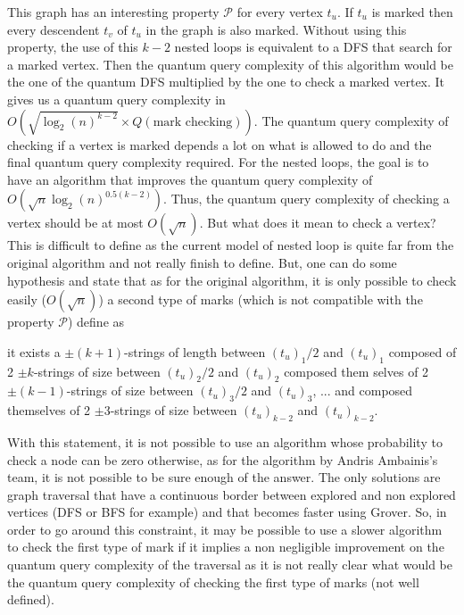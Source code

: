 This graph has an interesting property $\mathcal{P}$ for every vertex $t_u$.
If $t_u$ is marked then every descendent $t_v$ of $t_u$ in the graph is also
marked.
Without using this property, the use of this $k-2$ nested loops is equivalent
to a DFS that search for a marked vertex. Then the quantum query complexity
of this algorithm would be the one of the quantum DFS multiplied by the one
to check a marked vertex. It gives us a quantum query complexity in
$O\left(\sqrt{\log_2(n)^{k-2}}\times Q(\textrm{mark\ checking})\right)$.
The quantum query complexity of checking if a vertex is marked depends a lot
on what is allowed to do and the final quantum query complexity required.
For the nested loops, the goal is to have an algorithm that improves the quantum
query complexity of $O\left(\sqrt{n}\log_2(n)^{0.5(k-2)}\right)$. Thus, the
quantum query complexity of checking a vertex should be at most $O(\sqrt{n})$.
But what does it mean to check a vertex? This is difficult to define as
the current model of nested loop is quite far from the original algorithm
and not really finish to define. But, one can do some hypothesis and state
that as for the original algorithm, it is only possible to check easily
($O(\sqrt{n})$) a second type of marks (which is not compatible with
the property $\mathcal{P}$) define as
\begin{center}
    \begin{minipage}{.8\textwidth}
        it exists a $\pm (k+1)$-strings of length between $(t_u)_1/2$ and  $(t_u)_1$ composed of
        2 $\pm k$-strings of size between $(t_u)_2/2$ and $(t_u)_2$ composed them selves of 2
        $\pm (k-1)$-strings of size between $(t_u)_3/2$ and $(t_u)_3$, ... and composed themselves
        of  2 $\pm 3$-strings of size between $(t_u)_{k-2}$ and $(t_u)_{k-2}$.
    \end{minipage}
\end{center}

With this statement, it is not possible to use an algorithm whose probability
to check a node can be zero otherwise, as for the algorithm by Andris Ambainis's
team, it is not possible to be sure enough of the answer. The only solutions
are graph traversal that have a continuous border between explored and
non explored vertices (DFS or BFS for example) and that becomes
faster using Grover. So, in order to go around this constraint, it may be
possible to use a slower algorithm to check the first type of mark if it
implies a non negligible improvement on the quantum query complexity of
the traversal as it is not really clear what would be the quantum
query complexity of checking the first type of marks (not well defined).

